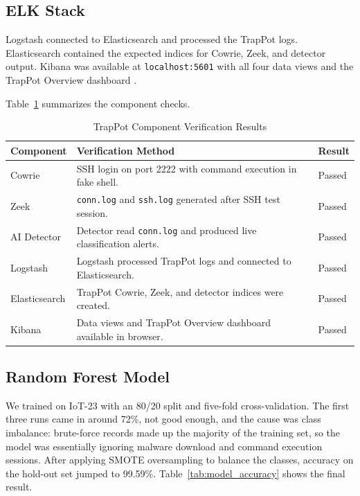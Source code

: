 \subsection*{ELK Stack}

Logstash connected to Elasticsearch and processed the TrapPot logs. Elasticsearch contained the expected indices for Cowrie, Zeek, and detector output. Kibana was available at \texttt{localhost:5601} with all four data views and the TrapPot Overview dashboard \cite{9001068}.

Table~\ref{tab:component_verification} summarizes the component checks.

\begin{table}[htbp]
\centering
\caption{TrapPot Component Verification Results}
\label{tab:component_verification}
\begin{tabular}{|p{4cm}|p{7cm}|p{2cm}|}
\hline
\textbf{Component} & \textbf{Verification Method} & \textbf{Result} \\
\hline
Cowrie & SSH login on port 2222 with command execution in fake shell. & Passed \\
\hline
Zeek & \texttt{conn.log} and \texttt{ssh.log} generated after SSH test session. & Passed \\
\hline
AI Detector & Detector read \texttt{conn.log} and produced live classification alerts. & Passed \\
\hline
Logstash & Logstash processed TrapPot logs and connected to Elasticsearch. & Passed \\
\hline
Elasticsearch & TrapPot Cowrie, Zeek, and detector indices were created. & Passed \\
\hline
Kibana & Data views and TrapPot Overview dashboard available in browser. & Passed \\
\hline
\end{tabular}
\end{table}

\subsection*{Random Forest Model}

We trained on IoT-23 \cite{iot23dataset} with an 80/20 split and five-fold cross-validation. The first three runs came in around 72\%, not good enough, and the cause was class imbalance: brute-force records made up the majority of the training set, so the model was essentially ignoring malware download and command execution sessions. After applying SMOTE oversampling to balance the classes, accuracy on the hold-out set jumped to 99.59\%. Table~\ref{tab:model_accuracy} shows the final result.

